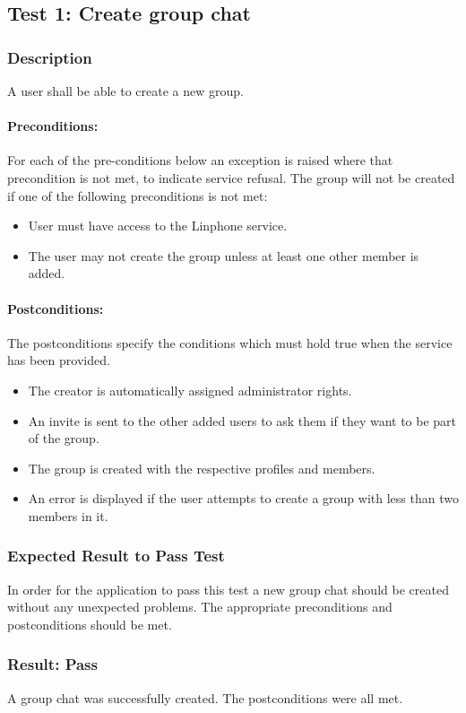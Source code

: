 \documentclass[11pt]{article}
\begin{document}
\subsection{Test 1: Create group chat}
\subsubsection{Description}
A user shall be able to create a new group.\\
\paragraph{Preconditions:}
For each of the pre-conditions below an exception is raised where that precondition is not met, to indicate service refusal.
The group will not be created if one of the following preconditions is not met:
\begin{itemize}
\item User must have access to the Linphone service.
\item The user may not create the group unless at least one other member is added.
\end{itemize}
\paragraph{Postconditions:}
The postconditions specify the conditions which must hold true when the service has been provided.
\begin{itemize}
\item The creator is automatically assigned administrator rights.
\item An invite is sent to the other added users to ask them if they want to be part of the group.
\item The group is created with the respective profiles and members.
\item An error is displayed if the user attempts to create a group with less than two members in it.
\end{itemize}

\subsubsection{Expected Result to Pass Test}
In order for the application to pass this test a new group chat should be created without any unexpected problems. The appropriate preconditions and postconditions should be met.
\subsubsection{Result: Pass}
A group chat was successfully created. The postconditions were all met.
\end{document}

